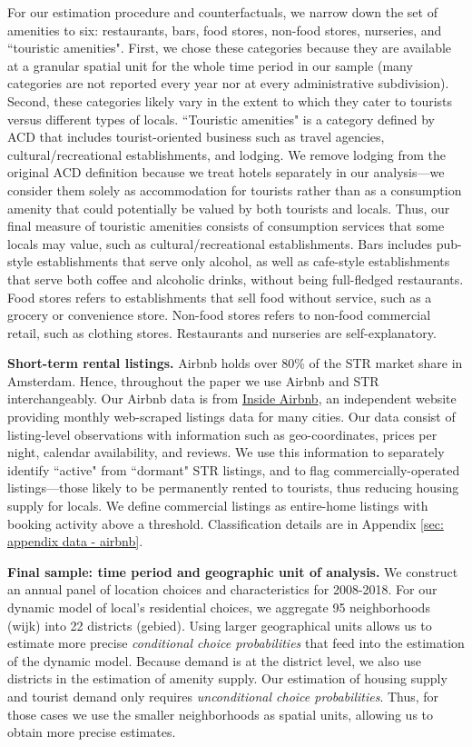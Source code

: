 \documentclass[11pt]{article}
\newcommand{\Paragraph}{\vspace{0.1cm}\noindent\textbf}
\begin{document}
For our estimation procedure and counterfactuals, we narrow down the set of amenities to six: restaurants, bars, food stores, non-food stores, nurseries, and ``touristic amenities". First, we chose these categories because they are available at a granular spatial unit for the whole time period in our sample (many categories are not reported every year nor at every administrative subdivision). Second, these categories likely vary in the extent to which they cater to tourists versus different types of locals. ``Touristic amenities" is a category defined by ACD that includes tourist-oriented business such as travel agencies, cultural/recreational establishments, and lodging. We remove lodging from the original ACD definition because we treat hotels separately in our analysis---we consider them solely as accommodation for tourists rather than as a consumption amenity that could potentially be valued by both tourists and locals. Thus, our final measure of touristic amenities consists of consumption services that some locals may value, such as cultural/recreational establishments. Bars includes pub-style establishments that serve only alcohol, as well as cafe-style establishments that serve both coffee and alcoholic drinks, without being full-fledged restaurants. Food stores refers to establishments that sell food without service, such as a grocery or convenience store. Non-food stores refers to non-food commercial retail, such as clothing stores. Restaurants and nurseries are self-explanatory.

\Paragraph{Short-term rental listings.} Airbnb holds over 80\% of the STR market share in Amsterdam. Hence, throughout the paper we use Airbnb and STR interchangeably. Our Airbnb data is from \href{http://insideairbnb.com/}{Inside Airbnb}, an independent website providing monthly web-scraped listings data for many cities. Our data consist of listing-level observations with information such as geo-coordinates, prices per night, calendar availability, and reviews. We use this information to separately identify ``active" from ``dormant" STR listings, and to flag commercially-operated listings---those likely to be permanently rented to tourists, thus reducing housing supply for locals. We define commercial listings as entire-home listings with booking activity above a threshold. Classification details are in Appendix \ref{sec: appendix data - airbnb}.

\Paragraph{Final sample: time period and geographic unit of analysis.} We construct an annual panel of location choices and characteristics for 2008-2018. For our dynamic model of local's residential choices, we aggregate 95 neighborhoods (wijk) into 22 districts (gebied). Using larger geographical units allows us to estimate more precise \textit{conditional choice probabilities} that feed into the estimation of the dynamic model. Because demand is at the district level, we also use districts in the estimation of amenity supply. Our estimation of housing supply and tourist demand only requires \textit{unconditional choice probabilities}. Thus, for those cases we use the smaller neighborhoods as spatial units, allowing us to obtain more precise estimates.
\end{document}
